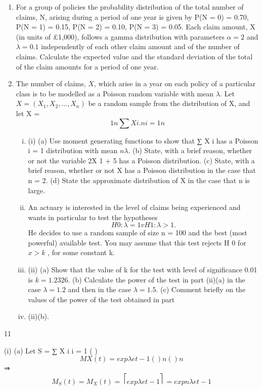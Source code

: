 \documentclass[a4paper,12pt]{article}
\begin{document}
\begin{enumerate}
\item For a group of policies the probability distribution of the total number of claims, N,
arising during a period of one year is given by
P(N = 0) = 0.70, P(N = 1) = 0.15, P(N = 2) = 0.10, P(N = 3) = 0.05.
Each claim amount, X (in units of £1,000), follows a gamma distribution with parameters $\alpha = 2$ and $\lambda = 0.1$ independently of each other claim amount and of the number of claims.
Calculate the expected value and the standard deviation of the total of the claim amounts for a period of one year.


\item The number of claims, $X$, which arise in a year on each policy of a particular class is to be modelled as a Poisson random variable with mean $\lambda$. Let $X = (X_1 , X_2 , \ldots, X_n )$ be a random sample from the distribution of X, and let X =
\[1 n
∑ X i .
n i = 1
n\]
\begin{enumerate}[(i)]
\item (i)
(a)
Use moment generating functions to show that
∑ X i has a Poisson
i = 1
distribution with mean $n\lambda$.
(b) State, with a brief reason, whether or not the variable 2X 1 + 5 has a Poisson distribution.
(c) State, with a brief reason, whether or not X has a Poisson distribution in the case that n = 2.
(d) State the approximate distribution of X in the case that n is large.
\item An actuary is interested in the level of claims being experienced and wants in particular to test the hypotheses
\[H 0 : \lambda = 1 v H 1 : \lambda > 1 .\]
He decides to use a random sample of size n = 100 and the best (most powerful) available test. You may assume that this test rejects H 0 for $x > k$ , for some constant k.
\item (ii)
(a) Show that the value of k for the test with level of significance 0.01 is $k = 1.2326$.
(b) Calculate the power of the test in part (ii)(a) in the case $\lambda = 1.2$ and then in the case $\lambda = 1.5$.
(c) Comment briefly on the values of the power of the test obtained in part
\item (ii)(b).
\end{enumerate}
\end{enumerate}
\newpage

11
\item (i)
(a)
Let S = ∑ X i
i = 1
{ (
) }
\[M X ( t ) = exp \lambda e t − 1
{ (
) }
n
{ (
) }
n\]
⇒ \[M_S ( t ) = { M_X ( t ) } = ⎡ exp \lambda e t − 1 ⎤ = exp n \lambda e t − 1\]
\end{document}
